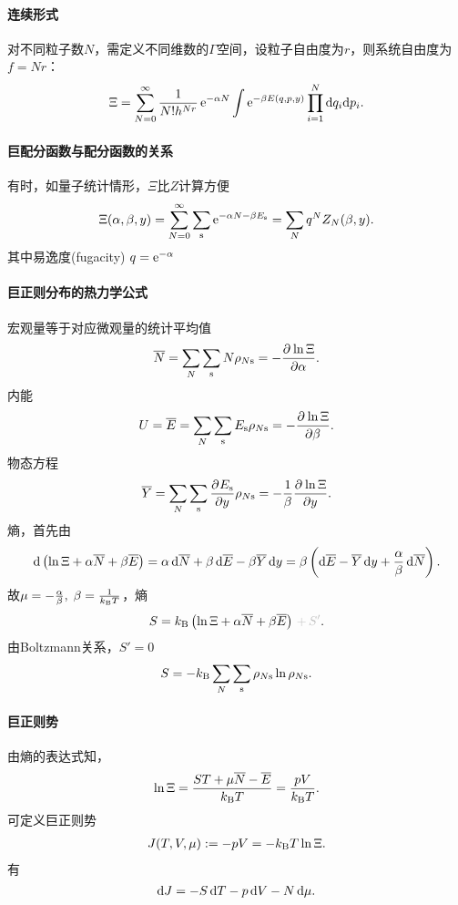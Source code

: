 \paragraph{连续形式}对不同粒子数$N$，需定义不同维数的$\Gamma$空间，设粒子自由度为$r$，则系统自由度为$f=Nr$：
\begin{align}
	\Xi=\sum_{N=0}^\infty\frac1{N!h^{Nr}}\e{-\alpha N}\int\e{-\beta E(q,p,y)}\prod_{i=1}^N\d q_i\nd p_i.
\end{align}
\paragraph{巨配分函数与配分函数的关系}有时，如量子统计情形，$\Xi$比$Z$计算方便
\[
	\Xi(\alpha,\beta,y)=\sum_{N=0}^\infty\sum_\st\e{-\alpha N-\beta E_\st}=\sum_Nq^NZ_N(\beta,y).
\]
其中易逸度(fugacity) $q=\e{-\alpha}$

\paragraph{巨正则分布的热力学公式}宏观量等于对应微观量的统计平均值
\begin{align}
	\avg N=\sum_N\sum_\st N\rho_{N\st}=-\pv{\ln\Xi}\alpha.
\end{align}
内能
\begin{align}
	U=\avg E=\sum_N\sum_\st E_\st\rho_{N\st}=-\pv{\ln\Xi}\beta.
\end{align}
物态方程
\begin{align}
	\avg Y=\sum_N\sum_\st\pv{E_\st}y\rho_{N\st}=-\frac1\beta\pv{\ln\Xi}y.
\end{align}
熵，首先由
\begin{align*}
	\d\kh{\ln\Xi+\alpha\avg N+\beta\avg E}=\alpha\d\avg N+\beta\d\avg E-\beta\avg Y\d y=\beta\kh{\d\avg E-\avg Y\d y+\frac\alpha\beta\d\avg N}.
\end{align*}
故$\mu=-\frac\alpha\beta,\;\beta=\frac1{\kB T}$，熵
\begin{align}
	S=\kB\kh{\ln\Xi+\alpha\avg N+\beta\avg E}{\color{lightgray}\,+\,S'}.
\end{align}
由Boltzmann关系，$S'=0$
\begin{align}
	S=-\kB\sum_N\sum_\st\rho_{N\st}\ln\rho_{N\st}.
\end{align}
\paragraph{巨正则势}
由熵的表达式知，
\[
	\ln\Xi=\frac{ST+\mu\avg N-\avg E}{\kB T}=\frac{pV}{\kB T}.
\]
可定义巨正则势
\begin{align}
	J(T,V,\mu):=-pV=-\kB T\ln\Xi.
\end{align}
有
\[
	\d J=-S\d T-p\d V-N\d\mu.
\]
